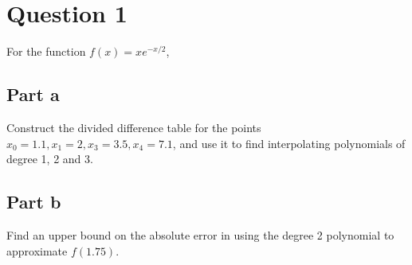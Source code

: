 \section{Question 1}

\begin{question}
    For the function $f(x) = xe^{-x/2}$,
\end{question}

\subsection{Part a}

\begin{question}
    Construct the divided difference table for the points $x_0 = 1.1, x_1 = 2, x_3 = 3.5, x_4 = 7.1$, and use it to find interpolating polynomials of degree 1, 2 and 3.
\end{question}

\begin{answer}
    
\end{answer}

\subsection{Part b}

\begin{question}
    Find an upper bound on the absolute error in using the degree 2 polynomial to approximate $f(1.75)$.
\end{question}
